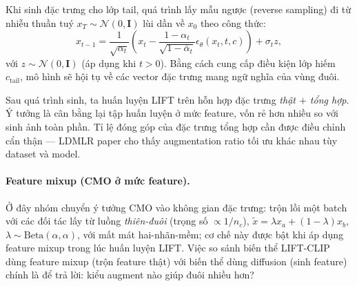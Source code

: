 Khi sinh đặc trưng cho lớp tail, quá trình lấy mẫu ngược (reverse sampling) đi từ nhiễu thuần tuý $x_T \sim \mathcal{N}(0,\mathbf{I})$ lùi dần về $x_0$ theo công thức:
\begin{equation}
    x_{t-1} = \frac{1}{\sqrt{\alpha_t}} \left( x_t - \frac{1 - \alpha_t}{\sqrt{1 - \bar{\alpha}_t}} \epsilon_\theta(x_t, t, c) \right) + \sigma_t z,
\end{equation}
với $z \sim \mathcal{N}(0,\mathbf{I})$ (áp dụng khi $t>0$). Bằng cách cung cấp điều kiện lớp hiếm $c_{\text{tail}}$, mô hình sẽ hội tụ về các vector đặc trưng mang ngữ nghĩa của vùng đuôi.
\medskip

Sau quá trình sinh, ta huấn luyện LIFT trên hỗn hợp đặc trưng \emph{thật $+$ tổng hợp}. Ý tưởng là
cân bằng lại tập huấn luyện ở mức feature, vốn rẻ hơn nhiều so với sinh ảnh toàn phần. Tỉ lệ
đóng góp của đặc trưng tổng hợp cần được điều chỉnh cẩn thận --- LDMLR paper cho thấy augmentation
ratio tối ưu khác nhau tùy dataset và model.


\paragraph{Feature mixup (CMO ở mức feature).} Ở đây nhóm chuyển ý tưởng CMO vào không gian đặc
trưng: trộn lồi một batch với các đối tác lấy từ luồng \emph{thiên-đuôi} (trọng số $\propto 1/n_c$),
$\tilde x=\lambda x_a+(1-\lambda)x_b$, $\lambda\sim\mathrm{Beta}(\alpha,\alpha)$, với mất mát
hai-nhãn-mềm; cơ chế này được bật khi áp dụng feature mixup trong lúc huấn luyện LIFT. Việc so sánh
biến thể LIFT-CLIP dùng feature mixup (trộn feature thật) với biến thể dùng diffusion (sinh feature)
chính là để trả lời: kiểu augment nào giúp đuôi nhiều hơn?

